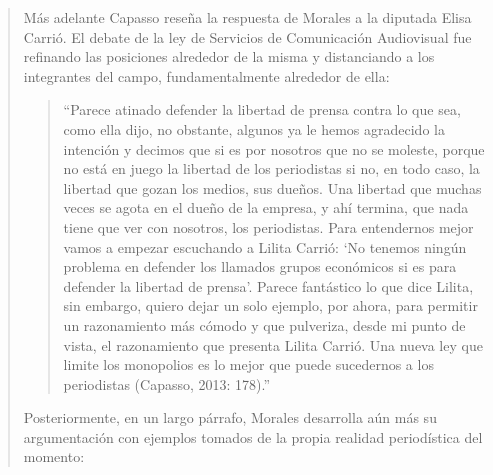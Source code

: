 \begin{quote}
Más adelante Capasso reseña la respuesta de Morales a la diputada Elisa Carrió. El debate de la ley de Servicios de Comunicación Audiovisual fue refinando las posiciones alrededor de la misma y distanciando a los integrantes del campo, fundamentalmente alrededor de ella:

\begin{quote}
	\enquote{Parece atinado defender la libertad de prensa contra lo que sea, como ella dijo, no obstante, algunos ya le hemos agradecido la intención y decimos que si es por nosotros que no se moleste, porque no está en juego la libertad de los periodistas si no, en todo caso, la libertad que gozan los medios, sus dueños. Una libertad que muchas veces se agota en el dueño de la empresa, y ahí termina, que nada tiene que ver con nosotros, los periodistas. Para entendernos mejor vamos a empezar escuchando a Lilita Carrió: \enquote{No tenemos ningún problema en defender los llamados grupos económicos si es para defender la libertad de prensa}. Parece fantástico lo que dice Lilita, sin embargo, quiero dejar un solo ejemplo, por ahora, para permitir un razonamiento más cómodo y que pulveriza, desde mi punto de vista, el razonamiento que presenta Lilita Carrió. Una nueva ley que limite los monopolios es lo mejor que puede sucedernos a los periodistas (Capasso, 2013: 178).}
\end{quote}


Posteriormente, en un largo párrafo, Morales desarrolla aún más su argumentación con ejemplos tomados de la propia realidad periodística del momento:


\end{quote}
